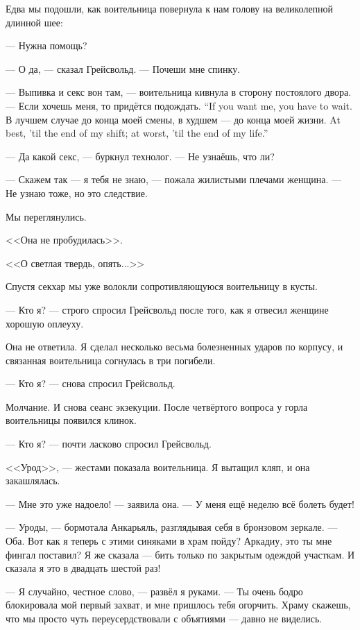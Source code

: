 Едва мы подошли, как воительница повернула к нам голову на великолепной длинной шее:

--- Нужна помощь?

--- О да, --- сказал Грейсвольд.
--- Почеши мне спинку.

--- Выпивка и секс вон там, --- воительница кивнула в сторону постоялого двора.
{--- Если хочешь меня, то придётся подождать.}
{``If you want me, you have to wait.}
{В лучшем случае до конца моей смены, в худшем --- до конца моей жизни.}
{At best, 'til the end of my shift; at worst, 'til the end of my life.''}

--- Да какой секс, --- буркнул технолог.
--- Не узнаёшь, что ли?

--- Скажем так --- я тебя не знаю, --- пожала жилистыми плечами женщина.
--- Не узнаю тоже, но это следствие.

Мы переглянулись.

<<Она не пробудилась>>.

<<О светлая твердь, опять...>>

Спустя секхар мы уже волокли сопротивляющуюся воительницу в кусты.

--- Кто я? --- строго спросил Грейсвольд после того, как я отвесил женщине хорошую оплеуху.

Она не ответила.
Я сделал несколько весьма болезненных ударов по корпусу, и связанная воительница согнулась в три погибели.

--- Кто я? --- снова спросил Грейсвольд.

Молчание.
И снова сеанс экзекуции.
После четвёртого вопроса у горла воительницы появился клинок.

--- Кто я? --- почти ласково спросил Грейсвольд.

<<Урод>>, --- жестами показала воительница.
Я вытащил кляп, и она закашлялась.

--- Мне это уже надоело! --- заявила она.
--- У меня ещё неделю всё болеть будет!

\asterism

--- Уроды, --- бормотала Анкарьяль, разглядывая себя в бронзовом зеркале.
--- Оба.
Вот как я теперь с этими синяками в храм пойду?
Аркадиу, это ты мне фингал поставил?
Я же сказала --- бить только по закрытым одеждой участкам.
И сказала я это в двадцать шестой раз!

--- Я случайно, честное слово, --- развёл я руками.
--- Ты очень бодро блокировала мой первый захват, и мне пришлось тебя огорчить.
Храму скажешь, что мы просто чуть переусердствовали с объятиями --- давно не виделись.

